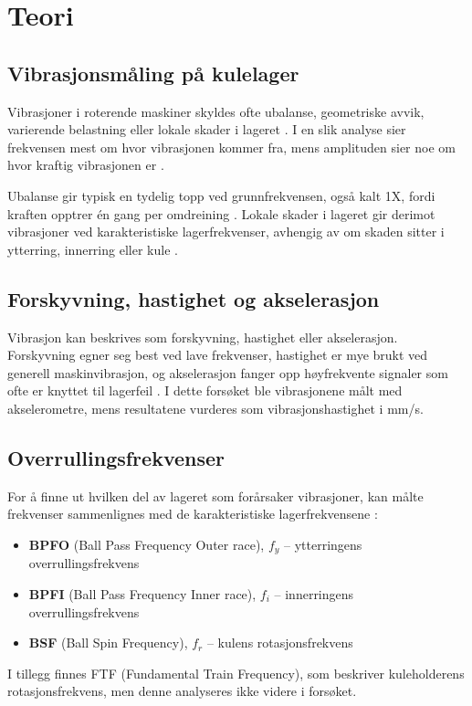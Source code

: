 \section{Teori}

\subsection{Vibrasjonsmåling på kulelager}
Vibrasjoner i roterende maskiner skyldes ofte ubalanse, geometriske avvik, varierende belastning eller lokale skader i lageret \parencite{vibrasjon3}. I en slik analyse sier frekvensen mest om hvor vibrasjonen kommer fra, mens amplituden sier noe om hvor kraftig vibrasjonen er \parencite{vibrasjon1, vibrasjon2}.

Ubalanse gir typisk en tydelig topp ved grunnfrekvensen, også kalt 1X, fordi kraften opptrer én gang per omdreining \parencite{vibrasjon2}. Lokale skader i lageret gir derimot vibrasjoner ved karakteristiske lagerfrekvenser, avhengig av om skaden sitter i ytterring, innerring eller kule \parencite{vibrasjon3}.

\subsection{Forskyvning, hastighet og akselerasjon}
Vibrasjon kan beskrives som forskyvning, hastighet eller akselerasjon. Forskyvning egner seg best ved lave frekvenser, hastighet er mye brukt ved generell maskinvibrasjon, og akselerasjon fanger opp høyfrekvente signaler som ofte er knyttet til lagerfeil \parencite{vibrasjon1}. I dette forsøket ble vibrasjonene målt med akselerometre, mens resultatene vurderes som vibrasjonshastighet i mm/s.

\subsection{Overrullingsfrekvenser}
For å finne ut hvilken del av lageret som forårsaker vibrasjoner, kan målte frekvenser sammenlignes med de karakteristiske lagerfrekvensene \parencite{vibrasjon3, beregninglager}:
\begin{itemize}
    \item \textbf{BPFO} (Ball Pass Frequency Outer race), $f_y$ -- ytterringens overrullingsfrekvens
    \item \textbf{BPFI} (Ball Pass Frequency Inner race), $f_i$ -- innerringens overrullingsfrekvens
    \item \textbf{BSF} (Ball Spin Frequency), $f_r$ -- kulens rotasjonsfrekvens
\end{itemize}
I tillegg finnes FTF (Fundamental Train Frequency), som beskriver kuleholderens rotasjonsfrekvens, men denne analyseres ikke videre i forsøket.

